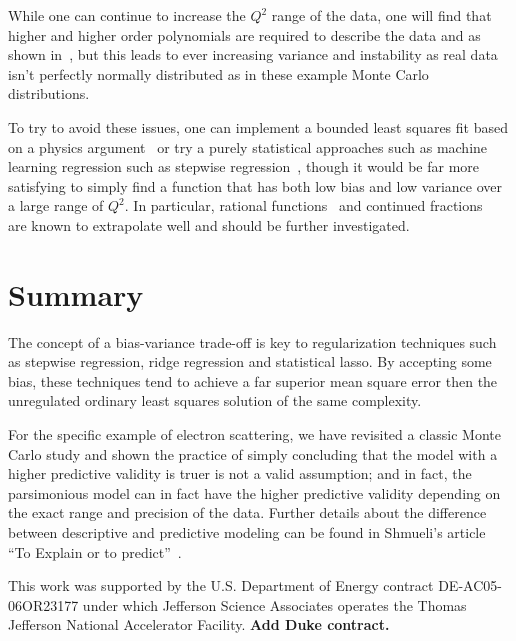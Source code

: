 \documentclass[10pt,aps,prc,twocolumn]{revtex4-1}
\begin{document}
While one can continue to increase the $Q^2$ range of the data, one will find that 
higher and higher order polynomials are required
to describe the data and as shown in~\cite{Kraus:2014qua}, but this leads to ever increasing variance 
and instability as real data isn't perfectly normally distributed as in these example Monte Carlo distributions.

To try to avoid these issues, one can implement a bounded least squares fit based on a 
physics argument~\cite{Horbatsch:2016ilr} 
or try a purely statistical approaches such as machine learning regression such as stepwise regression~\cite{Higinbotham:rja},
though it would be far more satisfying to simply find a function that has both low bias and low variance over a large 
range of $Q^2$.  In particular, rational functions~\cite{Kelly:2004hm,Puckett:2017flj} and continued 
fractions~\cite{Sick:2003gm} are known to extrapolate well and should be further investigated.

\section{Summary}

The concept of a bias-variance trade-off is key to regularization techniques such as stepwise regression, 
ridge regression and statistical lasso.    By accepting some bias, these techniques tend to achieve a far 
superior mean square error then the unregulated ordinary least squares solution of the same complexity.     

For the specific example of electron scattering, we have revisited a classic Monte Carlo study and shown
the practice of simply concluding that the model with a higher predictive validity 
is truer is not a valid assumption; and in fact, the  parsimonious model can in fact 
have the higher predictive validity depending on the exact range and precision of the data.
Further details about the difference between descriptive and predictive modeling can be 
found in Shmueli's article ``To Explain or to predict''~\cite{Shmueli:2010}.

This work was supported by the U.S.  Department of Energy contract DE-AC05-06OR23177
under which Jefferson Science Associates operates the Thomas Jefferson National 
Accelerator Facility.    {\bf{Add Duke contract.}}


\end{document}

